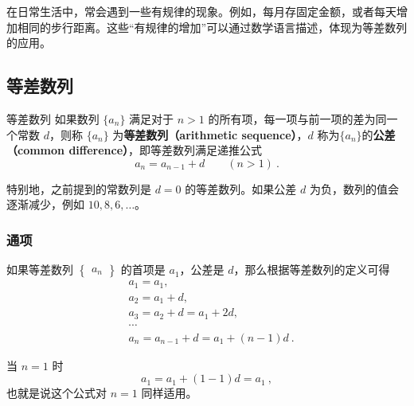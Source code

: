 
\begin{issues}
\issueDraft
\end{issues}


在日常生活中，常会遇到一些有规律的现象。例如，每月存固定金额，或者每天增加相同的步行距离。这些“有规律的增加”可以通过数学语言描述，体现为等差数列的应用。






\subsection{等差数列}

\begin{definition}{等差数列}
如果数列 $\{a_n\}$ 满足对于 $n > 1$ 的所有项，每一项与前一项的差为同一个常数 $d$，则称 $\{a_n\}$ 为\textbf{等差数列（arithmetic sequence）}，$d$ 称为$\{a_n\}$的\textbf{公差（common difference）}，即等差数列满足递推公式
\begin{equation}
a_{n}=a_{n-1}+d\qquad(n>1)~.
\end{equation}
\end{definition}

特别地，之前提到的常数列是 $d = 0$ 的等差数列。如果公差 $d$ 为负，数列的值会逐渐减少，例如 $10, 8, 6, \dots$。

\subsubsection{通项}
如果等差数列 $\begin{Bmatrix} a_n \end{Bmatrix}$ 的首项是 $a_1$，公差是 $d$，那么根据等差数列的定义可得
\begin{equation}
\begin{aligned}
&a_1 = a_1,\\
&a_2 = a_1 + d,\\
&a_3 = a_2 + d = a_1 + 2d,\\
&\cdots \\
&a_n = a_{n-1} + d = a_1 + (n - 1)d~.
\end{aligned}
\end{equation}

当 $n = 1$ 时
\begin{equation}
a_1 = a_1 + (1 - 1)d = a_1~,
\end{equation}
也就是说这个公式对 $n = 1$ 同样适用。

